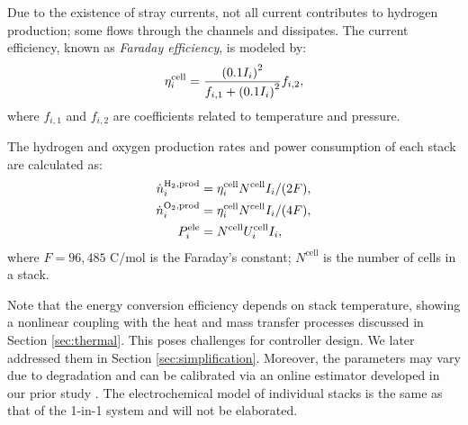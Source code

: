 \documentclass[review,3p,10pt]{elsarticle}
\begin{document}
Due to the existence of stray currents, not all current contributes to hydrogen production; some flows through the channels and dissipates. The current efficiency, known as \emph{Faraday efficiency}, is modeled by:
\begin{align}
  \eta_i^{\rm{cell}} = \frac{\left(0.1 I_i\right)^2}{f_{i,1} + \left( 0.1 I_i \right)^2} f_{i,2}, \label{eq:faraday}
\end{align}
where $f_{i,1}$ and $f_{i,2}$ are coefficients related to temperature and pressure.

The hydrogen and oxygen production rates and power consumption of each stack are calculated as:
\begin{align}
  \dot{n}_{i}^{\text{H}_2,\text{prod}} &= { \eta_i^{\rm{cell}} N^{\rm{cell}} I_i}/{(2F)}, \label{eq:oxygenflow} \\
  \dot{n}_{i}^{\text{O}_2,\text{prod}} &= { \eta_i^{\rm{cell}} N^{\rm{cell}} I_i}/{(4F)}, \label{eq:hydrogenflow} \\
  P_i^{\rm{ele}} &= N^{\rm{cell}} U_i^{\rm{cell}} I_i,  \label{eq:power}
\end{align}
where $F=96,485$ C/mol is the Faraday's constant; $N^\text{cell}$ is the number of cells in a stack.


Note that the energy conversion efficiency depends on stack temperature, showing a nonlinear coupling with the heat and mass transfer processes discussed in Section \ref{sec:thermal}.
This poses challenges for controller design. 
We later addressed them %
in Section \ref{sec:simplification}. Moreover, the parameters may vary due to degradation and can be calibrated via an online estimator developed in our prior study \cite{qiu2023dynamic}. The electrochemical model of individual stacks is the same as that of the 1-in-1 system and will not be elaborated.

\end{document}
